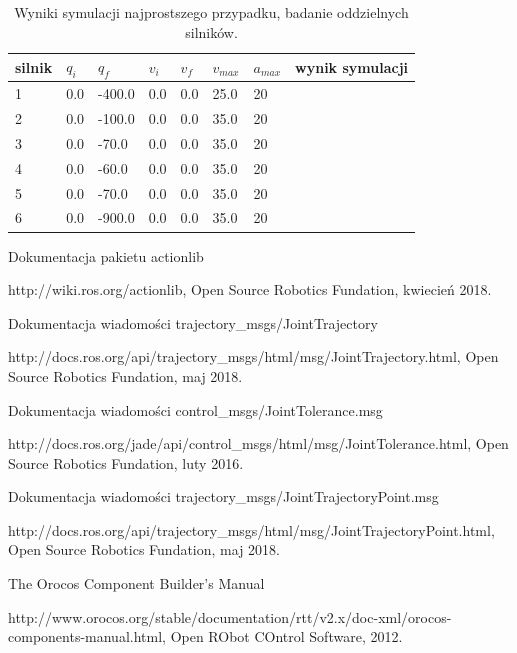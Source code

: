 \documentclass[a4paper, 12pt]{article}
\begin{document}
	\begin{table}[H]
	\centering
	\begin{tabular}{|m{2.5em}|m{4em}|m{4em}|m{4em}|m{4em}|m{4em}|m{4em}|m{5em}|}
	\hline
	silnik&$ q_i $ & $ q_f $ & $ v_i $ & $ v_f $ & $ v_{max} $ & $ a_{max} $&wynik symulacji\\
	\hline
	\hline
	\hspace{1em}1& 0.0 & -400.0 & 0.0 & 0.0 & 25.0 & 20&\hspace{2em}\checkmark\\ 
	\hline
	\hspace{1em}2& 0.0 & -100.0 & 0.0 & 0.0 & 35.0 & 20&\hspace{2em}\checkmark\\  
	\hline
	\hspace{1em}3& 0.0 & -70.0 & 0.0 & 0.0 & 35.0 & 20&\hspace{2em}\checkmark\\ 
	\hline
	\hspace{1em}4& 0.0 & -60.0 & 0.0 & 0.0 & 35.0 & 20&\hspace{2em}\checkmark\\  
	\hline
	\hspace{1em}5& 0.0 & -70.0 & 0.0 & 0.0 & 35.0 & 20&\hspace{2em}\checkmark\\  
	\hline
	\hspace{1em}6& 0.0 & -900.0 & 0.0 & 0.0 & 35.0 & 20&\hspace{2em}\checkmark\\  
	\hline
	\end{tabular}
	\caption{Wyniki symulacji najprostszego przypadku, badanie oddzielnych silników.}
	\label{tab:setup2}
	\end{table}
	
		
\newpage	
\begin{thebibliography}{9}
Dokumentacja pakietu actionlib

http://wiki.ros.org/actionlib, Open Source Robotics Fundation, kwiecień 2018.

Dokumentacja wiadomości trajectory\_msgs/JointTrajectory

http://docs.ros.org/api/trajectory\_msgs/html/msg/JointTrajectory.html, Open Source Robotics Fundation, maj 2018.

Dokumentacja wiadomości control\_msgs/JointTolerance.msg

http://docs.ros.org/jade/api/control\_msgs/html/msg/JointTolerance.html, Open Source Robotics Fundation, luty 2016.

Dokumentacja wiadomości trajectory\_msgs/JointTrajectoryPoint.msg

http://docs.ros.org/api/trajectory\_msgs/html/msg/JointTrajectoryPoint.html, Open Source Robotics Fundation, maj 2018.

The Orocos Component Builder's Manual

 http://www.orocos.org/stable/documentation/rtt/v2.x/doc-xml/orocos-components-manual.html, Open RObot COntrol Software, 2012.
\end{thebibliography}	
	
\end{document}

